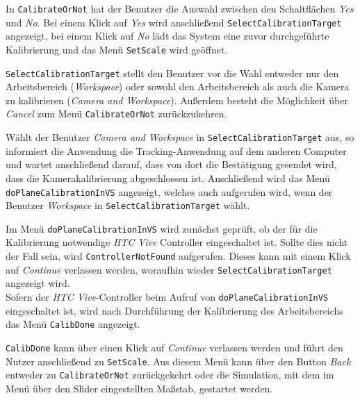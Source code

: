 In \texttt{CalibrateOrNot} hat der Benutzer die Auswahl zwischen den Schaltflächen \textit{Yes} und \textit{No}. Bei einem Klick auf \textit{Yes} wird anschließend \texttt{Select\-Calibration\-Target} angezeigt, bei einem Klick auf \textit{No} lädt das System eine zuvor durchgeführte Kalibrierung und das Menü \texttt{Set\-Scale} wird geöffnet.

\texttt{Select\-Calibration\-Target} stellt den Benutzer vor die Wahl entweder nur den Arbeitsbereich (\textit{Work\-space}) oder sowohl den Arbeitsbereich als auch die Kamera zu kalibrieren (\textit{Camera and Workspace}). Außerdem besteht die Möglichkeit über \textit{Cancel} zum Menü \texttt{Calibrate\-Or\-Not} zurückzukehren.

Wählt der Benutzer \textit{Camera and Workspace} in \texttt{Select\-Calibration\-Target} aus, so informiert die Anwendung die Tracking-Anwendung auf dem anderen Computer und wartet anschließend darauf, dass von dort die Bestätigung gesendet wird, dass die Kamerakalibrierung abgeschlossen ist. Anschließend wird das Menü \texttt{doPlane\-Calibration\-InVS} angezeigt, welches auch aufgerufen wird, wenn der Benutzer \textit{Work\-space} in \texttt{Select\-Calibration\-Target} wählt.

Im Menü \texttt{doPlane\-Calibration\-InVS} wird zunächst geprüft, ob der für die Kalibrierung notwendige \textit{HTC Vive} Controller eingeschaltet ist. Sollte dies nicht der Fall sein, wird \texttt{Controller\-Not\-Found} aufgerufen. Dieses kann mit einem Klick auf \textit{Continue} verlassen werden, woraufhin wieder \texttt{Select\-Calibration\-Target} angezeigt wird.\\
Sofern der \textit{HTC Vive}-Controller beim Aufruf von \texttt{doPlane\-Calibration\-InVS} eingeschaltet ist, wird nach Durchführung der Kalibrierung des Arbeitsbereichs das Menü \texttt{CalibDone} angezeigt.

\texttt{Calib\-Done} kann über einen Klick auf \textit{Continue} verlassen werden und führt den Nutzer anschließend zu \texttt{SetScale}. Aus diesem Menü kann über den Button \textit{Back} entweder zu \texttt{CalibrateOrNot} zurückgekehrt oder die Simulation, mit dem im Menü über den Slider eingestellten Maßstab, gestartet werden.



